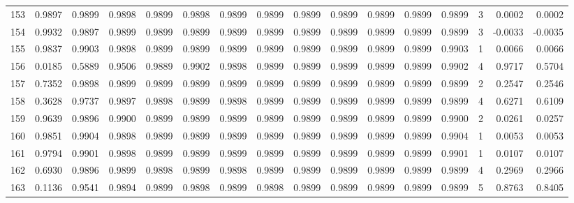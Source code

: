 \begin{tabular}{lrrrrrrrrrrrrrrr}
153 &      0.9897 &  0.9899 &  0.9898 &  0.9899 &  0.9898 &  0.9899 &  0.9899 &  0.9899 &  0.9899 &  0.9899 &   0.9899 &     0.9899 &      3 &                    0.0002 &                     0.0002 \\
154 &      0.9932 &  0.9897 &  0.9899 &  0.9899 &  0.9899 &  0.9899 &  0.9899 &  0.9899 &  0.9899 &  0.9899 &   0.9899 &     0.9899 &      3 &                   -0.0033 &                    -0.0035 \\
155 &      0.9837 &  0.9903 &  0.9898 &  0.9899 &  0.9899 &  0.9899 &  0.9899 &  0.9899 &  0.9899 &  0.9899 &   0.9899 &     0.9903 &      1 &                    0.0066 &                     0.0066 \\
156 &      0.0185 &  0.5889 &  0.9506 &  0.9889 &  0.9902 &  0.9898 &  0.9899 &  0.9899 &  0.9899 &  0.9899 &   0.9899 &     0.9902 &      4 &                    0.9717 &                     0.5704 \\
157 &      0.7352 &  0.9898 &  0.9899 &  0.9899 &  0.9899 &  0.9899 &  0.9899 &  0.9899 &  0.9899 &  0.9899 &   0.9899 &     0.9899 &      2 &                    0.2547 &                     0.2546 \\
158 &      0.3628 &  0.9737 &  0.9897 &  0.9898 &  0.9899 &  0.9898 &  0.9899 &  0.9899 &  0.9899 &  0.9899 &   0.9899 &     0.9899 &      4 &                    0.6271 &                     0.6109 \\
159 &      0.9639 &  0.9896 &  0.9900 &  0.9899 &  0.9899 &  0.9899 &  0.9899 &  0.9899 &  0.9899 &  0.9899 &   0.9899 &     0.9900 &      2 &                    0.0261 &                     0.0257 \\
160 &      0.9851 &  0.9904 &  0.9898 &  0.9899 &  0.9899 &  0.9899 &  0.9899 &  0.9899 &  0.9899 &  0.9899 &   0.9899 &     0.9904 &      1 &                    0.0053 &                     0.0053 \\
161 &      0.9794 &  0.9901 &  0.9898 &  0.9899 &  0.9899 &  0.9899 &  0.9899 &  0.9899 &  0.9899 &  0.9899 &   0.9899 &     0.9901 &      1 &                    0.0107 &                     0.0107 \\
162 &      0.6930 &  0.9896 &  0.9899 &  0.9898 &  0.9899 &  0.9898 &  0.9899 &  0.9899 &  0.9899 &  0.9899 &   0.9899 &     0.9899 &      4 &                    0.2969 &                     0.2966 \\
163 &      0.1136 &  0.9541 &  0.9894 &  0.9899 &  0.9898 &  0.9899 &  0.9898 &  0.9899 &  0.9899 &  0.9899 &   0.9899 &     0.9899 &      5 &                    0.8763 &                     0.8405 \\

\end{tabular}
